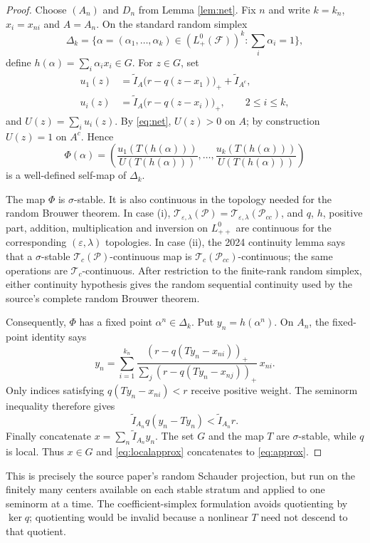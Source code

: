 \documentclass[11pt]{article}
\newcommand{\Lzp}{L^0_{+}(\mathcal F)}
\newcommand{\Tc}{\mathcal T_c}
\newcommand{\Tel}{\mathcal T_{\varepsilon,\lambda}}
\newcommand{\Pcc}{\mathcal P_{cc}}
\newcommand{\ind}{\widetilde I}
\begin{document}
\begin{proof}
Choose $(A_n)$ and $D_n$ from Lemma \ref{lem:net}.  Fix $n$ and write
$k=k_n$, $x_i=x_{ni}$ and $A=A_n$.  On the standard random simplex
\[
 \Delta_k=\{\alpha=(\alpha_1,\ldots,\alpha_k)\in(\Lzp)^k:
                    \textstyle\sum_i\alpha_i=1\},
\]
define $h(\alpha)=\sum_i\alpha_i x_i\in G$.  For $z\in G$, set
\begin{align*}
 u_1(z)&=\ind_A\bigl(r-q(z-x_1)\bigr)_+ +\ind_{A^c},\\
 u_i(z)&=\ind_A\bigl(r-q(z-x_i)\bigr)_+,
       \qquad 2\le i\le k,
\end{align*}
and $U(z)=\sum_i u_i(z)$.  By \eqref{eq:net}, $U(z)>0$ on $A$;
by construction $U(z)=1$ on $A^c$.  Hence
\begin{equation}\label{eq:Phi}
 \Phi(\alpha)=
 \left(\frac{u_1(T(h(\alpha)))}{U(T(h(\alpha)))},\ldots,
       \frac{u_k(T(h(\alpha)))}{U(T(h(\alpha)))}\right)
\end{equation}
is a well-defined self-map of $\Delta_k$.

The map $\Phi$ is $\sigma$-stable.  It is also continuous in the topology
needed for the random Brouwer theorem.  In case (i),
$\Tel(\mathcal P)=\Tel(\Pcc)$, and $q$, $h$, positive part, addition,
multiplication and inversion on $L^0_{++}$ are continuous for the
corresponding $(\varepsilon,\lambda)$ topologies.  In case (ii), the 2024
continuity lemma says that a $\sigma$-stable
$\Tc(\mathcal P)$-continuous map is $\Tc(\Pcc)$-continuous; the same
operations are $\Tc$-continuous.  After restriction to the finite-rank
random simplex, either continuity hypothesis gives the random sequential
continuity used by the source's complete random Brouwer theorem.

Consequently, $\Phi$ has a fixed point $\alpha^n\in\Delta_k$.  Put
$y_n=h(\alpha^n)$.  On $A_n$, the fixed-point identity says
\[
 y_n=\sum_{i=1}^{k_n}
 \frac{(r-q(Ty_n-x_{ni}))_+}
      {\sum_j(r-q(Ty_n-x_{nj}))_+}\,x_{ni}.
\]
Only indices satisfying $q(Ty_n-x_{ni})<r$ receive positive weight.
The seminorm inequality therefore gives
\begin{equation}\label{eq:localapprox}
 \ind_{A_n}q(y_n-Ty_n)<\ind_{A_n}r.
\end{equation}
Finally concatenate $x=\sum_n\ind_{A_n}y_n$.  The set $G$ and the map
$T$ are $\sigma$-stable, while $q$ is local.  Thus $x\in G$ and
\eqref{eq:localapprox} concatenates to \eqref{eq:approx}.
\end{proof}

This is precisely the source paper's random Schauder projection, but run
on the finitely many centers available on each stable stratum and applied
to one seminorm at a time.  The coefficient-simplex formulation avoids
quotienting by $\ker q$; quotienting would be invalid because a nonlinear
$T$ need not descend to that quotient.
\end{document}
